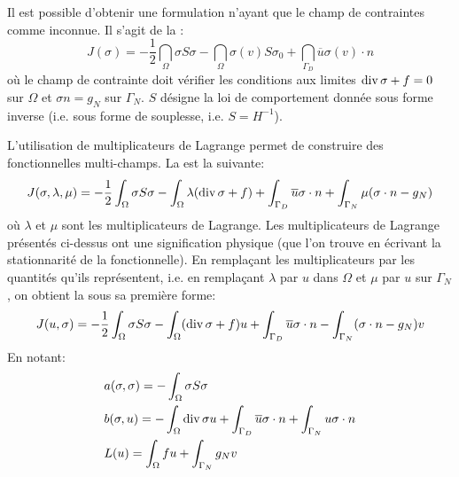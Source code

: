 \medskip
Il est possible d'obtenir une formulation n'ayant que le champ de contraintes
comme inconnue. Il s'agit de la :
\begin{equation}
J(\sigma) =
-\frac12 \dint_\Omega \sigma S \sigma
-\dint_\Omega \sigma(v) S\sigma_0
+ \dint_{\Gamma_D} \overline{u} \sigma(v)\cdot n
\end{equation}
où le champ de contrainte doit vérifier les conditions aux limites $\operatorname{div} \sigma + f =0$ sur $\Omega$
et $\sigma n = g_N$ sur $\Gamma_N$.
$S$ désigne la loi de comportement donnée sous forme inverse (i.e. sous forme de
souplesse, i.e. $S=H^{-1}$).

\medskip
L'utilisation de multiplicateurs de Lagrange permet de construire des fonctionnelles multi-champs.
La  est la suivante:
\begin{equation}
J(\sigma,\lambda,\mu) =
-\frac12\displaystyle\int_\Omega \sigma S \sigma
-\displaystyle\int_\Omega \lambda (\operatorname{div} \sigma + f)
+ \displaystyle\int_{\Gamma_D} \overline{u}\sigma\cdot n
+ \displaystyle\int_{\Gamma_N} \mu (\sigma\cdot n -g_N)
\end{equation}
où $\lambda$ et $\mu$ sont les multiplicateurs de Lagrange.
\medskip
Les multiplicateurs de Lagrange présentés ci-dessus ont une signification physique
(que l'on trouve en écrivant la stationnarité de la fonctionnelle).
En remplaçant les multiplicateurs par les quantités qu'ils représentent, i.e. en remplaçant
$\lambda$ par $u$ dans $\Omega$ et $\mu$ par $u$ sur $\Gamma_N$, on obtient la
sous sa première forme:
\begin{equation}
J(u,\sigma) =
-\frac12 \displaystyle\int_\Omega \sigma S \sigma
-\displaystyle\int_\Omega (\operatorname{div} \sigma+f) u
+ \displaystyle\int_{\Gamma_D} \overline{u}\sigma\cdot n
- \displaystyle\int_{\Gamma_N} (\sigma\cdot n-g_N) v
\end{equation}
En notant:
\begin{align} 
&a(\sigma,\sigma)=-\displaystyle\int_\Omega \sigma S\sigma\\
&b(\sigma,u)=-\displaystyle\int_\Omega \operatorname{div}\sigma u + \displaystyle\int_{\Gamma_D} \overline{u}\sigma\cdot n + \displaystyle\int_{\Gamma_N} u\sigma\cdot n\\
&L(u)=\displaystyle\int_\Omega fu + \displaystyle\int_{\Gamma_N} g_N v\end{align}
